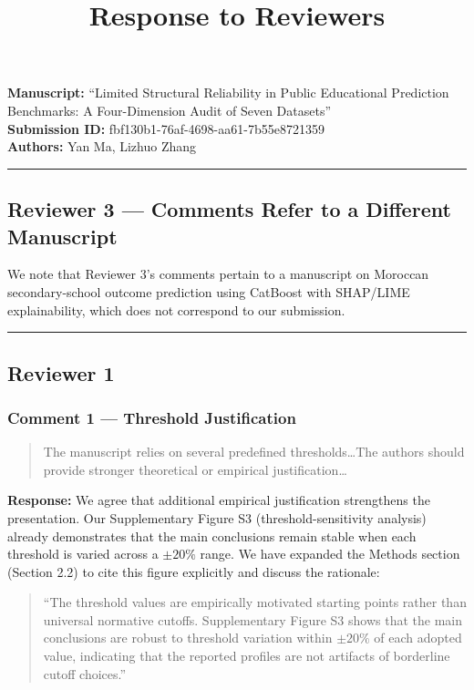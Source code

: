 \documentclass[12pt,a4paper]{article}
\title{\textbf{Response to Reviewers}}
\author{}
\date{}
\begin{document}
\maketitle

\noindent
\textbf{Manuscript:} ``Limited Structural Reliability in Public Educational Prediction Benchmarks: A Four-Dimension Audit of Seven Datasets''\\
\textbf{Submission ID:} fbf130b1-76af-4698-aa61-7b55e8721359\\
\textbf{Authors:} Yan Ma, Lizhuo Zhang

\bigskip
\hrule
\bigskip

\subsection*{Reviewer 3 --- Comments Refer to a Different Manuscript}

We note that Reviewer 3's comments pertain to a manuscript on Moroccan secondary-school outcome prediction using CatBoost with SHAP/LIME explainability, which does not correspond to our submission.

\bigskip
\hrule
\bigskip

\subsection*{Reviewer 1}

\subsubsection*{Comment 1 --- Threshold Justification}

\begin{quote}
The manuscript relies on several predefined thresholds\ldots The authors should provide stronger theoretical or empirical justification\ldots
\end{quote}

\textbf{Response:} We agree that additional empirical justification strengthens the presentation. Our Supplementary Figure S3 (threshold-sensitivity analysis) already demonstrates that the main conclusions remain stable when each threshold is varied across a $\pm20\%$ range. We have expanded the Methods section (Section 2.2) to cite this figure explicitly and discuss the rationale:

\begin{quote}
``The threshold values are empirically motivated starting points rather than universal normative cutoffs. Supplementary Figure S3 shows that the main conclusions are robust to threshold variation within $\pm20\%$ of each adopted value, indicating that the reported profiles are not artifacts of borderline cutoff choices.''
\end{quote}
\end{document}
